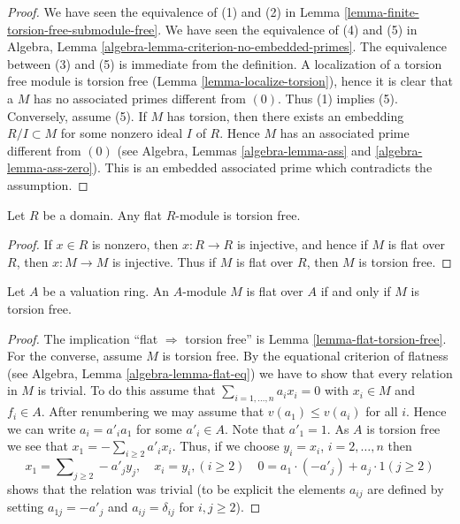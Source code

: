 \begin{proof}
We have seen the equivalence of (1) and (2) in
Lemma \ref{lemma-finite-torsion-free-submodule-free}.
We have seen the equivalence of (4) and (5) in
Algebra, Lemma \ref{algebra-lemma-criterion-no-embedded-primes}.
The equivalence between (3) and (5) is immediate from the definition.
A localization of a torsion free module is torsion free
(Lemma \ref{lemma-localize-torsion}), hence it is clear that a
$M$ has no associated primes different from $(0)$. Thus (1)
implies (5). Conversely, assume (5). If $M$ has torsion,
then there exists an embedding $R/I \subset M$ for some nonzero
ideal $I$ of $R$. Hence $M$ has an associated prime different
from $(0)$
(see Algebra, Lemmas \ref{algebra-lemma-ass} and \ref{algebra-lemma-ass-zero}).
This is an embedded associated prime which contradicts the assumption.
\end{proof}

\begin{lemma}
\label{lemma-flat-torsion-free}
Let $R$ be a domain. Any flat $R$-module is torsion free.
\end{lemma}

\begin{proof}
If $x \in R$ is nonzero, then $x : R \to R$ is injective, and hence if $M$
is flat over $R$, then $x : M \to M$ is injective. Thus if $M$ is flat over
$R$, then $M$ is torsion free.
\end{proof}

\begin{lemma}
\label{lemma-valuation-ring-torsion-free-flat}
Let $A$ be a valuation ring.
An $A$-module $M$ is flat over $A$ if and only if $M$ is torsion free.
\end{lemma}

\begin{proof}
The implication ``flat $\Rightarrow$ torsion free'' is
Lemma \ref{lemma-flat-torsion-free}.
For the converse, assume $M$ is torsion free.
By the equational criterion of flatness (see
Algebra, Lemma \ref{algebra-lemma-flat-eq})
we have to show that every relation in $M$ is trivial. To do this assume that
$\sum_{i = 1, \ldots, n} a_i x_i = 0$ with $x_i \in M$ and $f_i \in A$.
After renumbering we may assume that $v(a_1) \leq v(a_i)$ for all $i$.
Hence we can write $a_i = a'_i a_1$ for some $a'_i \in A$. Note that
$a'_1 = 1$. As $A$ is torsion free we see that
$x_1 = - \sum_{i \geq 2} a'_i x_i$. Thus, if we choose
$y_i = x_i$, $i = 2, \ldots, n$ then
$$
x_1 = \sum\nolimits_{j \geq 2} -a'_j y_j, \quad
x_i = y_i, (i \geq 2)\quad
0 = a_1 \cdot (-a'_j) + a_j \cdot 1 (j \geq 2)
$$
shows that the relation was trivial (to be explicit the elements
$a_{ij}$ are defined by setting $a_{1j} = -a'_j$ and $a_{ij} = \delta_{ij}$
for $i, j \geq 2$).
\end{proof}

